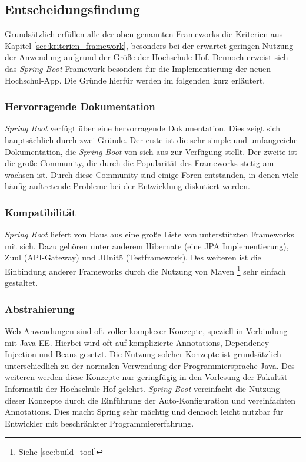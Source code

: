 \subsection*{Entscheidungsfindung}

Grundsätzlich erfüllen alle der oben genannten Frameworks die Kriterien aus Kapitel \ref{sec:kriterien_framework}, besonders bei der erwartet geringen Nutzung der Anwendung aufgrund der Größe der Hochschule Hof. Dennoch erweist sich das \textit{Spring Boot} Framework besonders für die Implementierung der neuen Hochschul-\ac{App}. Die Gründe hierfür werden im folgenden kurz erläutert.

\subsubsection*{Hervorragende Dokumentation}
\textit{Spring Boot} verfügt über eine hervorragende Dokumentation. Dies zeigt sich hauptsächlich durch zwei Gründe. Der erste ist die sehr simple und umfangreiche Dokumentation, die \textit{Spring Boot} von sich aus zur Verfügung stellt. Der zweite ist die große Community, die durch die Popularität des Frameworks stetig am wachsen ist. Durch diese Community sind einige Foren entstanden, in denen viele häufig auftretende Probleme bei der Entwicklung diskutiert werden.

\subsubsection*{Kompatibilität}
\textit{Spring Boot} liefert von Haus aus eine große Liste von unterstützten Frameworks mit sich. Dazu gehören unter anderem Hibernate (eine \ac{JPA} Implementierung), Zuul (\ac{API}-Gateway) und JUnit5 (Testframework). Des weiteren ist die Einbindung anderer Frameworks durch die Nutzung von Maven \footnote{Siehe \ref{sec:build_tool}} sehr einfach gestaltet.

\subsubsection*{Abstrahierung}
Web Anwendungen sind oft voller komplexer Konzepte, speziell in Verbindung mit Java \ac{EE}. Hierbei wird oft auf komplizierte Annotations, Dependency Injection und Beans gesetzt. Die Nutzung solcher Konzepte ist grundsätzlich unterschiedlich zu der normalen Verwendung der Programmiersprache Java. Des weiteren werden diese Konzepte nur geringfügig in den Vorlesung der Fakultät Informatik der Hochschule Hof gelehrt. \textit{Spring Boot} vereinfacht die Nutzung dieser Konzepte durch die Einführung der Auto-Konfiguration und vereinfachten Annotations. Dies macht Spring sehr mächtig und dennoch leicht nutzbar für Entwickler mit beschränkter Programmiererfahrung.

